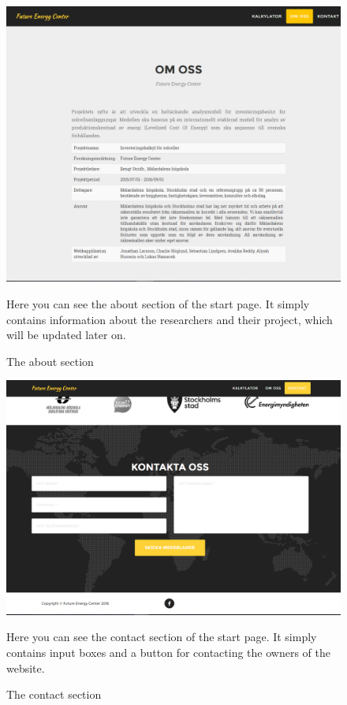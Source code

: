 \documentclass[]{article}
\begin{document}
\begin{figure}[H]
	\centering
	\includegraphics[width=1.0\linewidth]{pic4}
	\caption{The about section}
	\medskip
	\small
	Here you can see the about section of the start page. It simply contains information about the researchers and their project, which will be updated later on. 
	\label{fig:pic4}
\end{figure}
\begin{figure}[H]
	\centering
	\includegraphics[width=1.0\linewidth]{pic5}
	\caption{The contact section}
	\medskip
	\small
	Here you can see the contact section of the start page. It simply contains input boxes and a button for contacting the owners of the website.
	\label{fig:pic5}
\end{figure}
\end{document}
